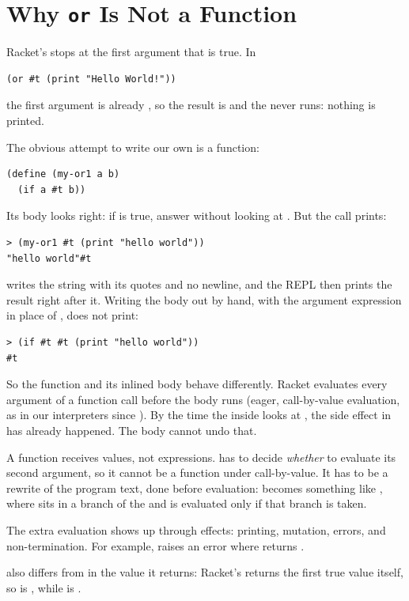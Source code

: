 \section{Why \texttt{or} Is Not a Function}
\label{sec:orfun}

Racket's  stops at the first argument that is true. In
\begin{lstlisting}
(or #t (print "Hello World!"))
\end{lstlisting}
the first argument is already , so the result is  and the  never runs: nothing is printed.

The obvious attempt to write our own  is a function:
\begin{lstlisting}
(define (my-or1 a b)
  (if a #t b))
\end{lstlisting}
Its body looks right: if  is true, answer  without looking at . But the call prints:
\begin{lstlisting}[style=repl]
> (my-or1 #t (print "hello world"))
"hello world"#t
\end{lstlisting}
 writes the string with its quotes and no newline, and the REPL then prints the result  right after it. Writing the body out by hand, with the argument expression in place of , does not print:
\begin{lstlisting}[style=repl]
> (if #t #t (print "hello world"))
#t
\end{lstlisting}
So the function and its inlined body behave differently. Racket evaluates every argument of a function call before the body runs (eager, call-by-value evaluation, as in our interpreters since ). By the time the  inside  looks at , the side effect in  has already happened. The body cannot undo that.

\begin{keypoint}
A function receives values, not expressions.  has to decide \emph{whether} to evaluate its second argument, so it cannot be a function under call-by-value. It has to be a rewrite of the program text, done before evaluation:  becomes something like , where  sits in a branch of the  and is evaluated only if that branch is taken.
\end{keypoint}

The extra evaluation shows up through effects: printing, mutation, errors, and non-termination. For example,  raises an error where  returns .

\begin{remark}
 also differs from  in the value it returns: Racket's  returns the first true value itself, so  is , while  is .
\end{remark}
